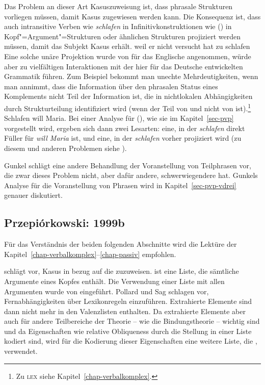 \noindent
Das Problem an dieser Art Kasuszuweisung ist, dass phrasale Strukturen vorliegen müssen,
damit Kasus zugewiesen werden kann. Die Konsequenz ist, dass auch intransitive Verben wie \emph{schlafen}
in Infinitivkonstruktionen wie () in Kopf"=Argument"=Strukturen oder ähnlichen Strukturen
projiziert werden müssen, damit das Subjekt Kasus erhält.
\ea
weil er nicht versucht hat zu schlafen
\z
Eine solche unäre Projektion wurde von \citet*[, Fn. 32]{ps2} für das Englische
angenommen, würde aber zu vielfältigen Interaktionen mit der hier für das Deutsche
entwickelten Grammatik führen. Zum Beispiel bekommt man unechte Mehrdeutigkeiten,
wenn man annimmt, dass die Information über den phrasalen Status eines Komplements 
nicht Teil der Information ist, die in nichtlokalen Abhängigkeiten durch Strukturteilung
identifiziert wird (wenn der \lexw{} Teil von \synsem und nicht von \HPSGloc ist).\footnote{
  Zu \textsc{lex} siehe Kapitel~\ref{chap-verbalkomplex}.%
}
\ea
Schlafen will Maria.
\z
Bei einer Analyse für (), wie sie im Kapitel~\ref{sec-pvp} vorgestellt wird, ergeben
sich dann zwei Lesarten: eine, in der \emph{schlafen} direkt Füller für \emph{will Maria}
ist, und eine, in der \emph{schlafen} vorher projiziert wird (zu diesem und anderen Problemen siehe
).

Gunkel schlägt eine andere Behandlung der Voranstellung von Teilphrasen vor, die
zwar dieses Problem nicht, aber dafür andere, schwerwiegendere hat. Gunkels Analyse
für die Voranstellung von Phrasen wird in Kapitel~\ref{sec-pvp-vdrei} genauer diskutiert.






\subsection{Przepi{\'o}rkowski: 1999b}
\label{kasus-adamp}

Für das Verständnis der beiden folgenden Abschnitte wird die Lektüre
der Kapitel~\ref{chap-verbalkomplex}--\ref{chap-passiv} empfohlen.

\citet{Prze99} schlägt vor, Kasus in bezug auf die \argstl zuzuweisen. \argst{} ist eine
Liste, die sämtliche Argumente eines Kopfes enthält. Die Verwendung einer
Liste mit allen Argumenten wurde von \citet[Kapitel~9]{ps2} eingeführt. Pollard
und Sag schlagen vor, Fernabhängigkeiten über Lexikonregeln einzuführen.
Extrahierte Elemente sind dann nicht mehr in den Valenzlisten enthalten.
Da extrahierte Elemente aber auch für andere Teilbereiche der Theorie -- wie \zb
die Bindungstheorie -- wichtig sind und da Eigenschaften wie
relative Obliqueness durch die Stellung in einer Liste kodiert sind, wird für die
Kodierung dieser Eigenschaften eine weitere Liste, die \argstl, verwendet.


